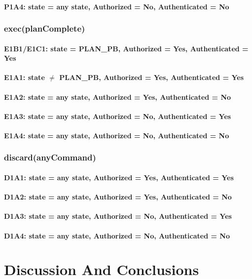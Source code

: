 \documentclass[../../main/main.tex]{subfiles}
\begin{document}
\paragraph*{P1A4: state  = any state, Authorized = No, Authenticated = No}
\subsubsection*{exec(planComplete)}
\paragraph*{E1B1/E1C1: state = PLAN_PB, Authorized = Yes, Authenticated = Yes}
\paragraph*{E1A1: state  $\neq$ PLAN_PB, Authorized = Yes, Authenticated = Yes}
\paragraph*{E1A2: state  = any state, Authorized = Yes, Authenticated = No}
\paragraph*{E1A3: state  = any state, Authorized = No, Authenticated = Yes}
\paragraph*{E1A4: state  = any state, Authorized = No, Authenticated = No}
\subsubsection*{discard(anyCommand)}
\paragraph*{D1A1: state  = any state, Authorized = Yes, Authenticated = Yes}
\paragraph*{D1A2: state  = any state, Authorized = Yes, Authenticated = No}
\paragraph*{D1A3: state  = any state, Authorized = No, Authenticated = Yes}
\paragraph*{D1A4: state  = any state, Authorized = No, Authenticated = No}

\section{Discussion And Conclusions}\label{chp:stpapb:discuss}
\end{document}
